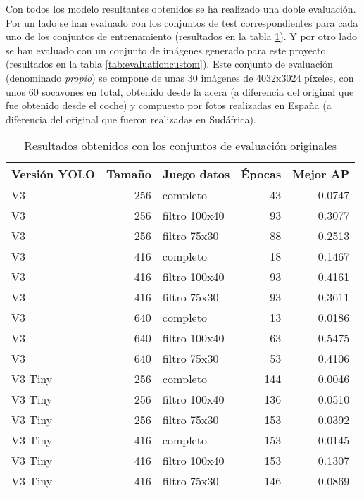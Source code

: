 Con todos los modelo resultantes obtenidos se ha realizado una doble evaluación. Por un lado se han evaluado con los conjuntos de test correspondientes para cada uno de los conjuntos de entrenamiento (resultados en la tabla \ref{tab:evaluationoriginal}). Y por otro lado se han evaluado con un conjunto de imágenes generado para este proyecto (resultados en la tabla \ref{tab:evaluationcustom}). Este conjunto de evaluación (denominado \textit{propio}) se compone de unas 30 imágenes de 4032x3024 píxeles, con unos 60 socavones en total, obtenido desde la acera (a diferencia del original que fue obtenido desde el coche) y compuesto por fotos realizadas en España (a diferencia del original que fueron realizadas en Sudáfrica).

\begin{table}[H]
	\centering
	\begin{tabular}{lrlrr}
		\toprule
		Versión YOLO &  Tamaño &    Juego datos &  Épocas &  Mejor AP \\
		\midrule
		V3      &     256 &       completo &      43 &    0.0747 \\
		V3      &     256 &  filtro 100x40 &      93 &    0.3077 \\
		V3      &     256 &   filtro 75x30 &      88 &    0.2513 \\
		V3      &     416 &       completo &      18 &    0.1467 \\
		V3      &     416 &  filtro 100x40 &      93 &    0.4161 \\
		V3      &     416 &   filtro 75x30 &      93 &    0.3611 \\
		V3      &     640 &       completo &      13 &    0.0186 \\
		V3      &     640 &  filtro 100x40 &      63 &    0.5475 \\
		V3      &     640 &   filtro 75x30 &      53 &    0.4106 \\
		V3 Tiny &     256 &       completo &     144 &    0.0046 \\
		V3 Tiny &     256 &  filtro 100x40 &     136 &    0.0510 \\
		V3 Tiny &     256 &   filtro 75x30 &     153 &    0.0392 \\
		V3 Tiny &     416 &       completo &     153 &    0.0145 \\
		V3 Tiny &     416 &  filtro 100x40 &     153 &    0.1307 \\
		V3 Tiny &     416 &   filtro 75x30 &     146 &    0.0869 \\
		\bottomrule
	\end{tabular}
	\caption{Resultados obtenidos con los conjuntos de evaluación originales}
	\label{tab:evaluationoriginal}
\end{table}


